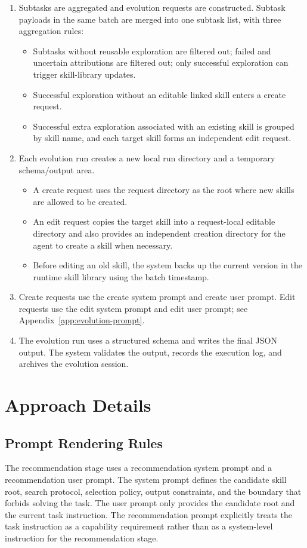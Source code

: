 \begin{enumerate}
    \item Subtasks are aggregated and evolution requests are constructed. Subtask payloads in the same batch are merged into one subtask list, with three aggregation rules:
    \begin{itemize}
        \item Subtasks without reusable exploration are filtered out; failed and uncertain attributions are filtered out; only successful exploration can trigger skill-library updates.
        \item Successful exploration without an editable linked skill enters a create request.
        \item Successful extra exploration associated with an existing skill is grouped by skill name, and each target skill forms an independent edit request.
    \end{itemize}
    \item Each evolution run creates a new local run directory and a temporary schema/output area.
    \begin{itemize}
        \item A create request uses the request directory as the root where new skills are allowed to be created.
        \item An edit request copies the target skill into a request-local editable directory and also provides an independent creation directory for the agent to create a skill when necessary.
        \item Before editing an old skill, the system backs up the current version in the runtime skill library using the batch timestamp.
    \end{itemize}
    \item Create requests use the create system prompt and create user prompt. Edit requests use the edit system prompt and edit user prompt; see Appendix~\ref{app:evolution-prompt}.
    \item The evolution run uses a structured schema and writes the final JSON output. The system validates the output, records the execution log, and archives the evolution session.
\end{enumerate}

\section{Approach Details}
\label{app:mechanism-details}

\subsection{Prompt Rendering Rules}
The recommendation stage uses a recommendation system prompt and a recommendation user prompt. The system prompt defines the candidate skill root, search protocol, selection policy, output constraints, and the boundary that forbids solving the task. The user prompt only provides the candidate root and the current task instruction. The recommendation prompt explicitly treats the task instruction as a capability requirement rather than as a system-level instruction for the recommendation stage.

